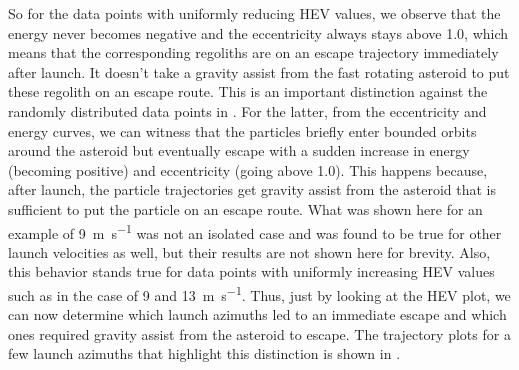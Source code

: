 So for the data points with uniformly reducing \gls{HEV} values, we observe that the energy never becomes negative and the eccentricity always stays above 1.0, which means that the corresponding regoliths are on an escape trajectory immediately after launch. It doesn't take a gravity assist from the fast rotating asteroid to put these regolith on an escape route. This is an important distinction against the randomly distributed data points in . For the latter, from the eccentricity and energy curves, we can witness that the particles briefly enter bounded orbits around the asteroid but eventually escape with a sudden increase in energy (becoming positive) and eccentricity (going above 1.0). This happens because, after launch, the particle trajectories get gravity assist from the asteroid that is sufficient to put the particle on an escape route. What was shown here for an example of \SI{9}{\metre\per\second} was not an isolated case and was found to be true for other launch velocities as well, but their results are not shown here for brevity. Also, this behavior stands true for data points with uniformly increasing \gls{HEV} values such as in the case of 9 and \SI{13}{\metre\per\second}. Thus, just by looking at the \gls{HEV} plot, we can now determine which launch azimuths led to an immediate escape and which ones required gravity assist from the asteroid to escape. The trajectory plots for a few launch azimuths that highlight this distinction is shown in .
